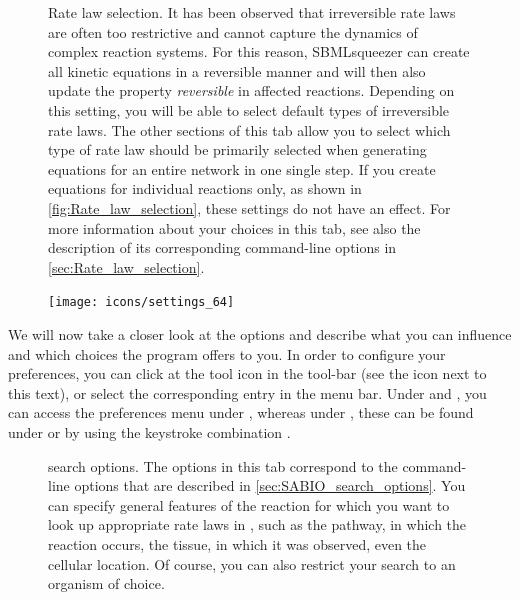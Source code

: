 \begin{figure}
\caption{Rate law selection.
It has been observed that irreversible rate laws are
often too restrictive and cannot capture the dynamics of complex reaction systems.
For this reason, SBMLsqueezer can create all kinetic equations in a reversible manner
and will then also update the property \emph{reversible} in affected reactions.
Depending on this setting, you will be able to select default types of irreversible
rate laws.
The other sections of this tab allow you to select which type of rate law should
be primarily selected when generating equations for an entire network in one single
step.
If you create equations for individual reactions only, as shown in \vref{fig:Rate_law_selection},
these settings do not have an effect.  
For more information about your choices in this tab, see also the description of
its corresponding command-line options in \vref{sec:Rate_law_selection}.}
\label{fig:Rate_law_selection}
\end{figure}
\begin{figure}
\vspace{\wrapfigspace}
\texttt{[image: icons/settings\_64]}
\end{figure}
We will now take a closer look at the options and describe what you can influence
and which choices the program offers to you.
In order to configure your preferences, you can click at the tool icon in the
tool-bar (see the icon next to this text), or select the corresponding entry in the menu bar.
Under \Windows and \Linux, you can access the preferences menu under
, whereas
under \MacOSX, these can be found under  or by using the keystroke
combination \keys{\cmd + {$,$}}.
\begin{figure}
\caption{\SABIO search options.
The options in this tab correspond to the command-line options that are described
in \vref{sec:SABIO_search_options}.
You can specify general features of the reaction for which you want to look up
appropriate rate laws in \SABIO, such as the pathway, in which the reaction
occurs, the tissue, in which it was observed, even the cellular location.
Of course, you can also restrict your search to an organism of choice.}
\label{fig:SABIO-RK_search_options}
\end{figure}
